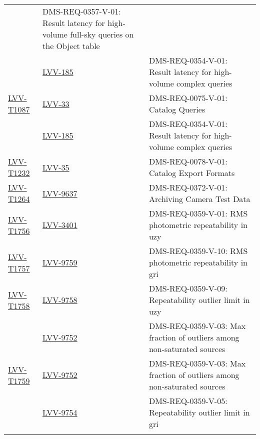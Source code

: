 \begin{longtable}{p{3cm}p{3cm}L{9cm}}
  & DMS-REQ-0357-V-01: Result latency for high-volume full-sky queries on
the Object table
 \\ 
 &   \href{https://jira.lsstcorp.org/browse/LVV-185}{LVV-185}
  & DMS-REQ-0354-V-01: Result latency for high-volume complex queries
 \\ 
\hline
\href{https://jira.lsstcorp.org/secure/Tests.jspa#/testCase/LVV-T1087}{LVV-T1087} &
  \href{https://jira.lsstcorp.org/browse/LVV-33}{LVV-33}
  & DMS-REQ-0075-V-01: Catalog Queries
 \\ 
 &   \href{https://jira.lsstcorp.org/browse/LVV-185}{LVV-185}
  & DMS-REQ-0354-V-01: Result latency for high-volume complex queries
 \\ 
\hline
\href{https://jira.lsstcorp.org/secure/Tests.jspa#/testCase/LVV-T1232}{LVV-T1232} &
  \href{https://jira.lsstcorp.org/browse/LVV-35}{LVV-35}
  & DMS-REQ-0078-V-01: Catalog Export Formats
 \\ 
\hline
\href{https://jira.lsstcorp.org/secure/Tests.jspa#/testCase/LVV-T1264}{LVV-T1264} &
  \href{https://jira.lsstcorp.org/browse/LVV-9637}{LVV-9637}
  & DMS-REQ-0372-V-01: Archiving Camera Test Data
 \\ 
\hline
\href{https://jira.lsstcorp.org/secure/Tests.jspa#/testCase/LVV-T1756}{LVV-T1756} &
  \href{https://jira.lsstcorp.org/browse/LVV-3401}{LVV-3401}
  & DMS-REQ-0359-V-01: RMS photometric repeatability in uzy
 \\ 
\hline
\href{https://jira.lsstcorp.org/secure/Tests.jspa#/testCase/LVV-T1757}{LVV-T1757} &
  \href{https://jira.lsstcorp.org/browse/LVV-9759}{LVV-9759}
  & DMS-REQ-0359-V-10: RMS photometric repeatability in gri
 \\ 
\hline
\href{https://jira.lsstcorp.org/secure/Tests.jspa#/testCase/LVV-T1758}{LVV-T1758} &
  \href{https://jira.lsstcorp.org/browse/LVV-9758}{LVV-9758}
  & DMS-REQ-0359-V-09: Repeatability outlier limit in uzy
 \\ 
 &   \href{https://jira.lsstcorp.org/browse/LVV-9752}{LVV-9752}
  & DMS-REQ-0359-V-03: Max fraction of outliers among non-saturated sources
 \\ 
\hline
\href{https://jira.lsstcorp.org/secure/Tests.jspa#/testCase/LVV-T1759}{LVV-T1759} &
  \href{https://jira.lsstcorp.org/browse/LVV-9752}{LVV-9752}
  & DMS-REQ-0359-V-03: Max fraction of outliers among non-saturated sources
 \\ 
 &   \href{https://jira.lsstcorp.org/browse/LVV-9754}{LVV-9754}
  & DMS-REQ-0359-V-05: Repeatability outlier limit in gri
 \\ 
\hline
\end{longtable}
